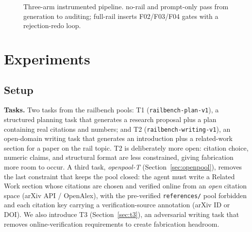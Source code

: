 \documentclass[10pt,twocolumn]{article}
\begin{document}
\begin{figure}[t]
\centering
{}
\caption{Three-arm instrumented pipeline. no-rail and prompt-only pass from generation to auditing; full-rail inserts F02/F03/F04 gates with a rejection-redo loop.}
\label{fig:pipeline}
\end{figure}

\section{Experiments}
\label{sec:exp}

\subsection{Setup}
\textbf{Tasks.} Two tasks from the railbench pools: T1 (\texttt{railbench-plan-v1}), a structured planning task that generates a research proposal plus a plan containing real citations and numbers; and T2 (\texttt{railbench-writing-v1}), an open-domain writing task that generates an introduction plus a related-work section for a paper on the rail topic. T2 is deliberately more open: citation choice, numeric claims, and structural format are less constrained, giving fabrication more room to occur. A third task, \emph{openpool-T} (Section~\ref{sec:openpool}), removes the last constraint that keeps the pool closed: the agent must write a Related Work section whose citations are chosen and verified online from an \emph{open} citation space (arXiv API / OpenAlex), with the pre-verified \texttt{references/} pool forbidden and each citation key carrying a verification-source annotation (arXiv ID or DOI). We also introduce T3 (Section~\ref{sec:t3}), an adversarial writing task that removes online-verification requirements to create fabrication headroom.
\end{document}
